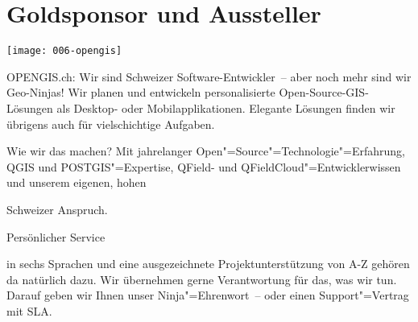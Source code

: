 \section*{Goldsponsor und Aussteller}
\begin{center}
  \texttt{[image: 006-opengis]}
\end{center}
{\dejavuSansFont OPENGIS.ch:} Wir sind {\dejavuSansFont Schweizer Software-Entwickler}~-- aber noch mehr sind
wir {\dejavuSansFont Geo-Ninjas!} Wir planen und entwickeln personalisierte {\dejavuSansFont Open-Source-GIS-Lösungen} als {\dejavuSansFont Desk\-top- oder Mobilapplikationen}. Elegante Lösungen finden
wir übrigens auch {\dejavuSansFont für vielschichtige Aufgaben}.

Wie wir das machen? Mit
jahrelanger {\dejavuSansFont Open"=Source"=Technologie"=Erfahrung, QGIS} und {\dejavuSansFont POSTGIS"=Expertise,
QField- und QField\-Cloud"=Entwicklerwissen} und unserem eigenen, hohen
{\dejavuSansFont Schweizer Anspruch.

Persönlicher Service} in {\dejavuSansFont sechs Sprachen} und eine
ausgezeichnete {\dejavuSansFont Projektunterstützung von A-Z} gehören da natürlich dazu. Wir
übernehmen gerne {\dejavuSansFont Verantwortung} für das, was wir tun. Darauf geben wir
Ihnen unser {\dejavuSansFont Ninja"=Ehrenwort}~-- oder einen {\dejavuSansFont Support"=Vertrag mit SLA}.
